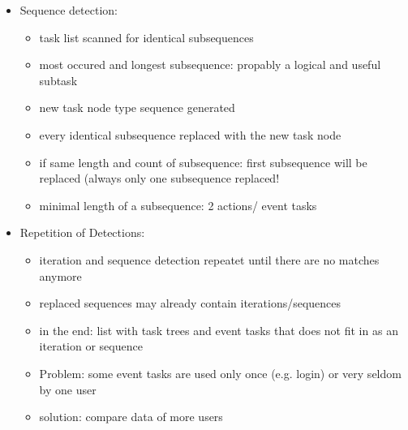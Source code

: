 \begin{itemize}
	\item Sequence detection:
	\begin{itemize}
		\item task list scanned for identical subsequences
    		\item most occured and longest subsequence: propably a logical and useful subtask
		\item new task node type sequence generated
		\item every identical subsequence replaced with the new task node 
		\item if same length and count of subsequence: first subsequence will be replaced (always only one subsequence replaced!
    		\item minimal length of a subsequence: 2 actions/ event tasks
	\end{itemize}
	\item Repetition of Detections:
	\begin{itemize}
		\item iteration and sequence detection repeatet until there are no matches anymore
  		\item replaced sequences may already contain iterations/sequences 
		\item in the end: list with task trees and event tasks that does not fit in as an iteration or sequence
		\item Problem: some event tasks are used only once (e.g. login) or very seldom by one user
		\item solution: compare data of more users 
	\end{itemize}
\end{itemize}
